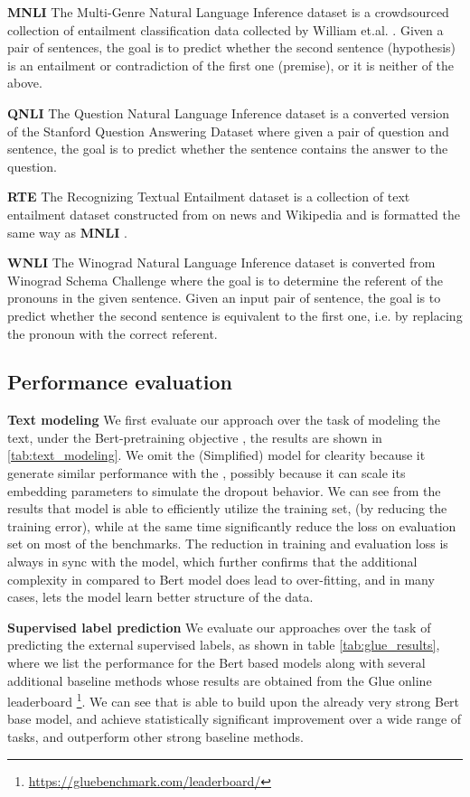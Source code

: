 \noindent \textbf{MNLI} The Multi-Genre Natural Language Inference dataset is a crowdsourced collection of entailment classification data collected by William et.al. \cite{williams2017broad}. 
Given a pair of sentences, the goal is to predict whether the 
second sentence (hypothesis) is an entailment or contradiction of the first one (premise), or it is neither of the above.

\noindent \textbf{QNLI} The Question Natural Language Inference dataset is a converted version of the Stanford Question Answering Dataset where given a pair of question and sentence, the goal is to predict whether the sentence contains the answer to the question.

\noindent \textbf{RTE} The Recognizing Textual Entailment dataset is a collection of text entailment dataset constructed from on news and Wikipedia and is formatted the same way as \textbf{MNLI} .

\noindent \textbf{WNLI} The Winograd Natural Language Inference dataset is converted from Winograd Schema Challenge where the goal is to determine the referent of the pronouns in the given sentence. Given an input pair of sentence, the goal is to predict whether the second sentence is equivalent to the first one, i.e. by replacing the pronoun with the correct referent.




\subsection{Performance evaluation}
\noindent \textbf{Text modeling}
We first evaluate our approach over the task of modeling the text, under the Bert-pretraining objective \cite{devlin2018bert}, the results are shown in \autoref{tab:text_modeling}. We omit the \BertMWE (Simplified) model for clearity because it generate similar performance with the \BertMWE, possibly because it can scale its embedding parameters to simulate the dropout behavior.
We can see from the results that \BertMWE model is able to efficiently utilize the training set, (by reducing the training error), while at the same time significantly reduce the loss on evaluation set on most of the benchmarks. 
The reduction in training and evaluation loss is always in sync with the \BertMWE model, which further confirms that the additional  complexity in \BertMWE compared to Bert model does lead to over-fitting, and in many cases, lets the model learn better structure of the data.

\noindent \textbf{Supervised label prediction}
We evaluate our approaches over the task of predicting the external supervised labels, as shown in table \autoref{tab:glue_results},
where we list the performance for the Bert based models along with several additional baseline methods whose results are obtained from the Glue online leaderboard \footnote{\url{https://gluebenchmark.com/leaderboard/}}.
We can see that \BertMWE is able to build upon the already very strong Bert base model, and achieve statistically significant improvement over a wide range of tasks, and outperform other strong baseline methods.






